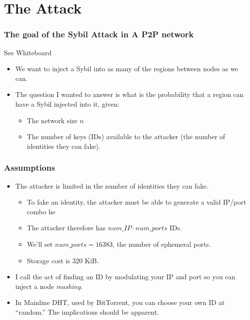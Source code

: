 \documentclass[11pt]{beamer}
\begin{document}
	
    
    
    \section{The Attack}
   	
       \begin{frame}
           \frametitle{The goal of the Sybil Attack in A P2P network}
           See Whiteboard
           \begin{itemize}
           \item We want to inject a Sybil into as many of the regions between nodes as we can.
             \item The question I wanted to answer is what is the probability that a region can have a Sybil injected into it, given:
             \begin{itemize}
                 \item The network size $n$
                 \item The number of keys (IDs) available to the attacker (the number of identities they can fake).
              \end{itemize}
            \end{itemize}
        \end{frame} 
       
       \begin{frame}
        \frametitle{Assumptions}
        \begin{itemize}
            \item The attacker is limited in the number of identities they can fake.
            
            \begin{itemize}
                \item To fake an identity, the attacker must be able to generate a valid IP/port combo he
                \item The attacker therefore has $num\_IP \cdot num\_ports$ IDs.
                \item We'll set $ num\_ports = 16383 $, the number of ephemeral ports.
                \item Storage cost is 320 KiB.
            \end{itemize}
            \item I call the act of finding an ID by modulating your IP and port so you can inject a node \emph{mashing}.
            \item In Mainline DHT, used by BitTorrent, you can choose your own ID at ``random.''   The implications should be apparent.
            
            \end{itemize}
    	\end{frame}
\end{document}
